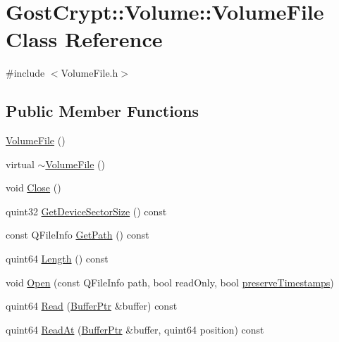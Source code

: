 \hypertarget{class_gost_crypt_1_1_volume_1_1_volume_file}{}\section{Gost\+Crypt\+:\+:Volume\+:\+:Volume\+File Class Reference}
\label{class_gost_crypt_1_1_volume_1_1_volume_file}


{\ttfamily \#include $<$Volume\+File.\+h$>$}

\subsection*{Public Member Functions}
\begin{DoxyCompactItemize}
\item 
\hyperlink{class_gost_crypt_1_1_volume_1_1_volume_file_a0860f8aae0794efc7e45e420de19221c}{Volume\+File} ()
\item 
virtual \hyperlink{class_gost_crypt_1_1_volume_1_1_volume_file_aef83d960b41025f29f31db1743108571}{$\sim$\+Volume\+File} ()
\item 
void \hyperlink{class_gost_crypt_1_1_volume_1_1_volume_file_a3481492a2e0fc6e35c8d0e8c5fd68cc7}{Close} ()
\item 
quint32 \hyperlink{class_gost_crypt_1_1_volume_1_1_volume_file_afbb8b01515352d6833230e38fd3d47e8}{Get\+Device\+Sector\+Size} () const
\item 
const Q\+File\+Info \hyperlink{class_gost_crypt_1_1_volume_1_1_volume_file_afa7e6863b060a91e7347a38870e11e5d}{Get\+Path} () const
\item 
quint64 \hyperlink{class_gost_crypt_1_1_volume_1_1_volume_file_aadde0ae09820b7315bc2db39bdb6c10a}{Length} () const
\item 
void \hyperlink{class_gost_crypt_1_1_volume_1_1_volume_file_a85139895e9f20d58fd3c35086001053f}{Open} (const Q\+File\+Info path, bool read\+Only, bool \hyperlink{class_gost_crypt_1_1_volume_1_1_volume_file_a8c6dc4712abe9ba03348af5938d200cb}{preserve\+Timestamps})
\item 
quint64 \hyperlink{class_gost_crypt_1_1_volume_1_1_volume_file_a726855fe6fb2618eb61abeaffffca8ec}{Read} (\hyperlink{class_gost_crypt_1_1_buffer_ptr}{Buffer\+Ptr} \&buffer) const
\item 
quint64 \hyperlink{class_gost_crypt_1_1_volume_1_1_volume_file_afc5d14b4925d83a120a0f184837b6f86}{Read\+At} (\hyperlink{class_gost_crypt_1_1_buffer_ptr}{Buffer\+Ptr} \&buffer, quint64 position) const

\end{DoxyCompactItemize}
